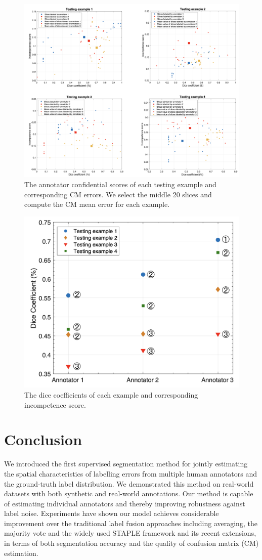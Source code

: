 \begin{figure}
        \center
        \includegraphics[width=0.75\linewidth]{chapter_8/picture98.png}
        \caption{The annotator confidential scores of each testing example and corresponding CM errors. We select the middle 20 slices and compute the CM mean error for each example.}
        \label{consensus&CM}
\end{figure}

\begin{figure}
        \center
        \includegraphics[width=0.8\linewidth]{chapter_8/picture99.png}
        \caption{The dice coefficients of each example and corresponding incompetence score.}
        \label{dice&score}
\end{figure}



\section{Conclusion}
We introduced the first supervised segmentation method for jointly estimating the spatial characteristics of labelling errors from multiple human annotators and the ground-truth label distribution. We demonstrated this method on real-world datasets with both synthetic and real-world annotations. Our method is capable of estimating individual annotators and thereby improving robustness against label noise. Experiments have shown our model achieves considerable improvement over the traditional label fusion approaches including averaging, the majority vote and the widely used STAPLE framework and its recent extensions, in terms of both segmentation accuracy and the quality of confusion matrix (CM) estimation.

